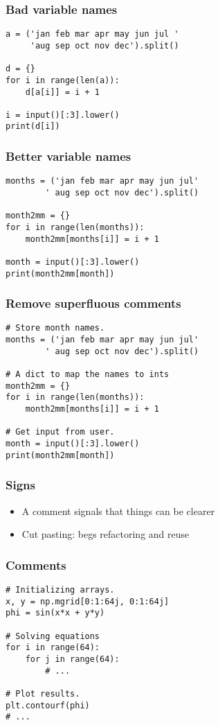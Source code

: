 \documentclass[14pt,compress]{beamer}
\begin{document}
\begin{frame}
  \frametitle{Bad variable names}

\begin{lstlisting}
a = ('jan feb mar apr may jun jul '
     'aug sep oct nov dec').split()

d = {}
for i in range(len(a)):
    d[a[i]] = i + 1

i = input()[:3].lower()
print(d[i])
\end{lstlisting}
\end{frame}

\begin{frame}
  \frametitle{Better variable names}

\begin{lstlisting}
months = ('jan feb mar apr may jun jul'
        ' aug sep oct nov dec').split()

month2mm = {}
for i in range(len(months)):
    month2mm[months[i]] = i + 1

month = input()[:3].lower()
print(month2mm[month])
\end{lstlisting}
\end{frame}

\begin{frame}[fragile]
  \frametitle{Remove superfluous comments}
\begin{lstlisting}
# Store month names.
months = ('jan feb mar apr may jun jul'
        ' aug sep oct nov dec').split()

# A dict to map the names to ints
month2mm = {}
for i in range(len(months)):
    month2mm[months[i]] = i + 1

# Get input from user.
month = input()[:3].lower()
print(month2mm[month])
\end{lstlisting}
\end{frame}

\begin{frame}
  \frametitle{Signs}
  \begin{itemize}
  \item A comment signals that things can be clearer
  \item Cut pasting: begs refactoring and reuse
  \end{itemize}
\end{frame}

\begin{frame}[fragile]
  \frametitle{Comments}
\begin{lstlisting}
# Initializing arrays.
x, y = np.mgrid[0:1:64j, 0:1:64j]
phi = sin(x*x + y*y)

# Solving equations
for i in range(64):
    for j in range(64):
        # ...

# Plot results.
plt.contourf(phi)
# ...

\end{lstlisting}
\end{frame}
\end{document}

